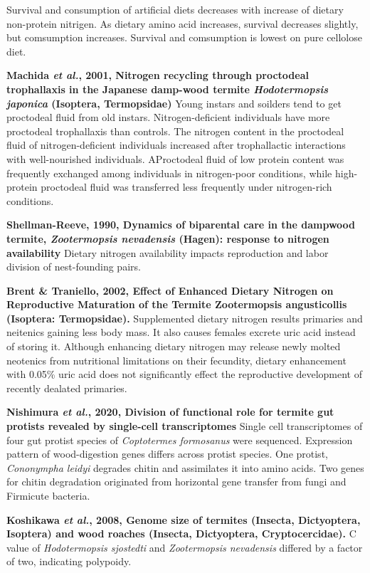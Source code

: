 \documentclass[11pt]{article}
\begin{document}
\begin{sloppypar}
Survival and consumption of artificial diets decreases with increase of dietary non-protein nitrigen. 
As dietary amino acid increases, survival decreases slightly, but comsumption increases. 
Survival and comsumption is lowest on pure cellolose diet. 
\par
\textbf{Machida \textit{et al.}, 2001, Nitrogen recycling through proctodeal trophallaxis in the Japanese damp-wood termite \textit{Hodotermopsis japonica} (Isoptera, Termopsidae)}
Young instars and soilders tend to get proctodeal fluid from old instars. 
Nitrogen-deficient individuals have more proctodeal trophallaxis than controls. 
The nitrogen content in the proctodeal fluid of nitrogen-deficient individuals increased after trophallactic interactions with well-nourished individuals.
AProctodeal fluid of low protein content was frequently exchanged among individuals in nitrogen-poor conditions, while high-protein proctodeal fluid was transferred less frequently under nitrogen-rich conditions. 
\par
\textbf{Shellman-Reeve, 1990, Dynamics of biparental care in the dampwood termite, \textit{Zootermopsis nevadensis} (Hagen): response to nitrogen availability} \newline
Dietary nitrogen availability impacts reproduction and labor division of nest-founding pairs. 
\par
\textbf{Brent & Traniello, 2002, Effect of Enhanced Dietary Nitrogen on Reproductive Maturation of the Termite Zootermopsis angusticollis (Isoptera: Termopsidae).} \newline
Supplemented dietary nitrogen results primaries and neitenics gaining less body mass. 
It also causes females excrete uric acid instead of storing it. 
Although enhancing dietary nitrogen may release newly molted neotenics from nutritional limitations on their fecundity, dietary enhancement with 0.05\% uric acid does not significantly effect the reproductive development of recently dealated primaries. 
\par
\textbf{Nishimura \textit{et al.}, 2020, Division of functional role for termite gut protists revealed by single-cell transcriptomes} \newline
Single cell transcriptomes of four gut protist species of \textit{Coptotermes formosanus} were sequenced. 
Expression pattern of wood-digestion genes differs across protist species. 
One protist, \textit{Cononympha leidyi} degrades chitin and assimilates it into amino acids. 
Two genes for chitin degradation originated from horizontal gene transfer from fungi and Firmicute bacteria.
\par
\textbf{Koshikawa \textit{et al.}, 2008, Genome size of termites (Insecta, Dictyoptera, Isoptera) and wood roaches (Insecta, Dictyoptera, Cryptocercidae).} \newline
C value of \textit{Hodotermopsis sjostedti} and \textit{Zootermopsis nevadensis} differed by a factor of two, indicating polypoidy.
\par

\end{sloppypar}
\end{document}
